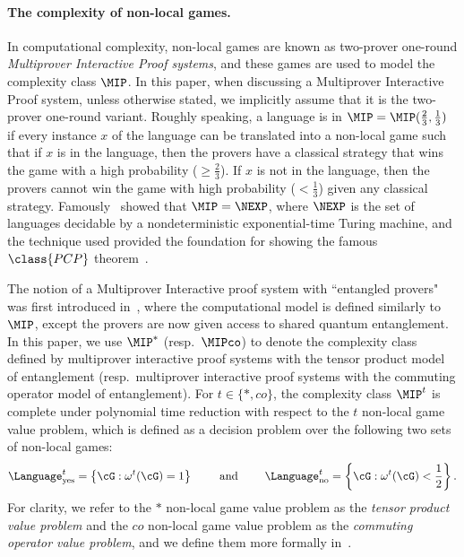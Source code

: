\paragraph{The complexity of non-local games. }In computational complexity, non-local games are known as two-prover one-round \textit{Multiprover Interactive Proof systems}, and these games are used to model the complexity class $\MIP$. In this paper, when discussing a Multiprover Interactive Proof system, unless otherwise stated, we implicitly assume that it is the two-prover one-round variant. Roughly speaking, a language is in $\MIP = \MIP(\frac{2}{3}, \frac{1}{3})$ if every instance $x$ of the language can be translated into a non-local game such that if $x$ is in the language, then the provers have a classical strategy that wins the game with a high probability ($\geq \frac{2}{3}$). If $x$ is not in the language, then the provers cannot win the game with high probability ($< \frac{1}{3}$) given any classical strategy. Famously~\cite{babaiNondeterministicExponentialTime1991a} showed that $\MIP=\NEXP$, where $\NEXP$ is the set of languages decidable by a nondeterministic exponential-time Turing machine, and the technique used provided the foundation for showing the famous $\class{PCP}$ theorem~\cite{aroraProbabilisticCheckingProofs1998,aroraProofVerificationHardness1998}. 


The notion of a Multiprover Interactive proof system with ``entangled provers" was first introduced in~\cite{cleveConsequencesLimitsNonlocal2004}, where the computational model is defined similarly to $\MIP$, except the provers are now given access to shared quantum entanglement. In this paper, we use $\MIP^*$ (resp.~$\MIPco$) to denote the complexity class defined by multiprover interactive proof systems with the tensor product model of entanglement (resp.~multiprover interactive proof systems with the commuting operator model of entanglement). For $t \in \{*, co\}$, the complexity class $\MIP^{t}$ is complete under polynomial time reduction with respect to the $t$ non-local game value problem, which is defined as a decision problem over the following two sets of non-local games:
\begin{equation*}
	\Language_{\text{yes}}^{t} = \left\{ \cG: \omega^{t}(\cG) = 1 \right\} \qquad \text{ and } \qquad	\Language_{\text{no}}^{t} = \left\{ \cG: \omega^{t}(\cG) < \frac{1}{2} \right\}. 
\end{equation*} 
For clarity, we refer to the $*$ non-local game value problem as the \textit{tensor product value problem} and the $co$ non-local game value problem as the \textit{commuting operator value problem}, and we define them more formally in~. 

